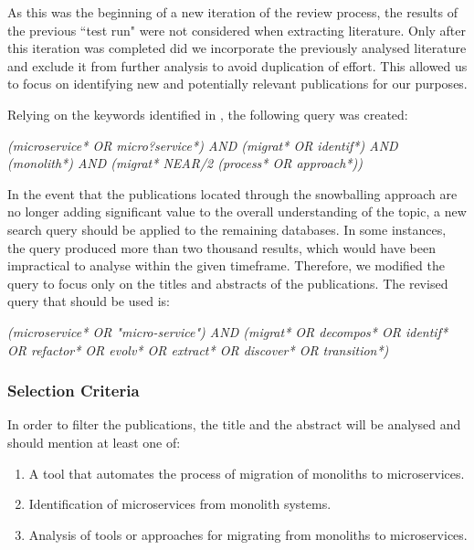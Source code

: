 \documentclass[conference]{IEEEtran}
\begin{document}
As this was the beginning of a new iteration of the review process, the results
of the previous ``test run" were not considered when extracting literature.
Only after this iteration was completed did we incorporate the previously
analysed literature and exclude it from further analysis to avoid duplication
of effort. This allowed us to focus on identifying new and potentially relevant
publications for our purposes.

Relying on the keywords identified in , the following
query was created:

\begin{center}
  \emph{(microservice* OR micro?service*) AND (migrat* OR identif*) AND
  (monolith*) AND (migrat* NEAR/2 (process* OR approach*))}
\end{center}

In the event that the publications located through the snowballing approach are
no longer adding significant value to the overall understanding of the topic, a
new search query should be applied to the remaining databases. In some
instances, the query produced more than two thousand results, which would have
been impractical to analyse within the given timeframe. Therefore, we modified
the query to focus only on the titles and abstracts of the publications. The
revised query that should be used is:

\begin{center}
  \emph{(microservice* OR "micro-service") AND (migrat* OR decompos* OR
  identif* OR refactor* OR evolv* OR extract* OR discover* OR transition*)}
\end{center}

\subsubsection{Selection Criteria} \label{sub:selection-criteria}

In order to filter the publications, the title and the abstract will be
analysed and should mention at least one of:

\begin{enumerate}[{IC}1.]
  \item A tool that automates the process of migration of monoliths to
    microservices.
  \item Identification of microservices from monolith systems.
  \item Analysis of tools or approaches for migrating from monoliths to
    microservices.
\end{enumerate}
\end{document}
